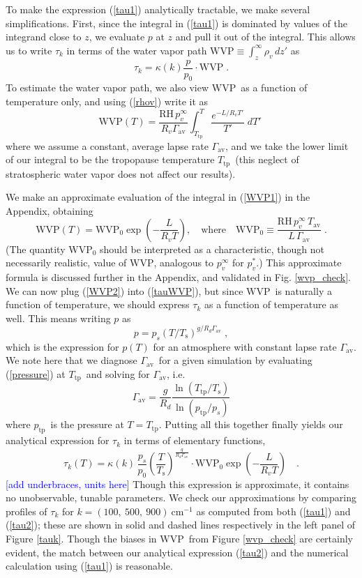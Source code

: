 \documentclass[10pt]{article}
\newcommand{\comment}[1]{\textcolor{blue}{[{#1}]}}
\newcommand{\beqn}{\begin{equation}}
\newcommand{\eeqn}{\end{equation}}
\newcommand{\eqnref}[1]{(\ref{#1})}
\newcommand{\cminverse}{\ensuremath{\mathrm{cm^{-1}}}}
\newcommand{\Tav}{\ensuremath{T_\mathrm{av}}}
\newcommand{\Ts}{\ensuremath{T_\mathrm{s}}}
\newcommand{\ps}{\ensuremath{p_s}}
\newcommand{\RH}{\ensuremath{\mathrm{RH}}}
\newcommand{\WVP}{\ensuremath{\mathrm{WVP}}}
\newcommand{\Ttp}{\ensuremath{T_\mathrm{tp}}}
\newcommand{\ptp}{\ensuremath{p_\mathrm{tp}}}
\newcommand{\gammaav}{\ensuremath{\Gamma_\mathrm{av}}}
\begin{document}
To make the expression   \eqnref{tau1}  analytically tractable, we make several simplifications.  First, since the integral in \eqnref{tau1} is dominated by values of the integrand close to $z$, we evaluate $p$  at $z$ and pull it out of the integral. This allows us to write $\tau_k$ in terms of the water vapor path $\WVP\equiv \int_z^\infty  \rho_v\, dz'$ as
	\beqn
		\tau_k =  \kappa(k) \frac{p}{p_0} \cdot \WVP \; .
	\label{tauWVP}
	\eeqn
To estimate the water vapor path, we also view \WVP\ as a function of temperature only, and using \eqnref{rhov} write it as 
	\beqn
		\WVP(T) =\frac{ \RH\, p_v^\infty}{R_v \gammaav}\int^T_{\Ttp} \frac{e^{-L/R_v T'}}{T'}\; dT' \; 
	\label{WVP1}
	\eeqn	
where we assume a constant, average lapse rate $\gammaav$, and we take the lower limit of our integral to be the tropopause temperature \Ttp\ (this neglect of stratospheric water vapor does not affect our results). 

We make an approximate evaluation of the integral in \eqnref{WVP1} in the Appendix, obtaining
	\beqn
		\WVP(T) =\WVP_0\exp\left(-\frac{L}{R_vT}\right),\quad \mbox{where}\quad  \WVP_0 \equiv \frac{\RH\, p_v^\infty\, \Tav}{L\,\gammaav} \; .
	\label{WVP2}
	\eeqn
(The quantity $\WVP_0$ should be interpreted as a characteristic, though not necessarily realistic, value of \WVP, analogous to $p_v^\infty$ for $p_v^*$.) This approximate formula is discussed further in the Appendix, and  validated in Fig. \ref{wvp_check}. We can now  plug \eqnref{WVP2} into \eqnref{tauWVP}, but  since \WVP\ is naturally a function of temperature, we should express $\tau_k$ as a function of temperature as well. This means writing $p$ as 
	\beqn
		p=\ps(T/\Ts)^{g/R_d\gammaav} \; ,
	\label{pressure}
	\eeqn 
	which is the expression for $p(T)$ for an atmosphere with constant lapse rate $\gammaav$. We note here that we diagnose \gammaav\ for a given simulation by evaluating \eqnref{pressure} at \Ttp\ and solving for  \gammaav, i.e.
	\beqn
		\gammaav = \frac{g}{R_d}\frac{\ln (\Ttp/\Ts)}{\ln(\ptp/\ps)}
	\label{gamma_diag}
	\eeqn
	where \ptp\ is the pressure at $T=\Ttp$. Putting all this together finally yields our  analytical expression for $\tau_k$ in terms of elementary functions,
	\beqn
		\tau_k(T) = \kappa(k)\,  \frac{\ps}{p_0}\left(\frac{T}{\Ts}\right)^{\frac{g}{R_d\gammaav}}\cdot \WVP_0\exp\left(-\frac{L}{R_v T}\right) \quad .
	\label{tau2}
	\eeqn
\comment{add underbraces, units here} Though this expression is approximate, it contains no unobservable, tunable parameters. We check our approximations by comparing profiles of $\tau_k$ for  $k=(100,\ 500,\ 900)\ \cminverse$ as computed from both \eqnref{tau1} and \eqnref{tau2}; these are shown in solid and dashed lines respectively in the left panel of Figure \ref{tauk}. Though the biases in \WVP\ from Figure \ref{wvp_check} are certainly evident, the match between our analytical expression \eqnref{tau2} and the numerical calculation using \eqnref{tau1} is reasonable.
\end{document}
